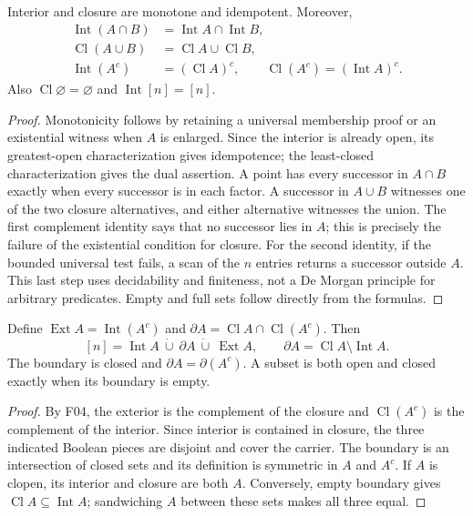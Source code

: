 \begin{theorem}\label{thm:finite-laws}
Interior and closure are monotone and idempotent.  Moreover,
\[
\begin{split}
 \operatorname{Int}(A\cap B)&=\operatorname{Int}A\cap\operatorname{Int}B,\\
 \operatorname{Cl}(A\cup B)&=\operatorname{Cl}A\cup\operatorname{Cl}B,\\
 \operatorname{Int}(A^c)&=(\operatorname{Cl}A)^c,\qquad
 \operatorname{Cl}(A^c)=(\operatorname{Int}A)^c.
\end{split}
\]
Also $\operatorname{Cl}\varnothing=\varnothing$ and
$\operatorname{Int}[n]=[n]$.
\end{theorem}
\begin{proof}
Monotonicity follows by retaining a universal membership proof or an
existential witness when $A$ is enlarged.  Since the interior is
already open, its greatest-open characterization gives idempotence;
the least-closed characterization gives the dual assertion.  A point
has every successor in $A\cap B$ exactly when every successor is
in each factor.  A successor in $A\cup B$ witnesses one of the two
closure alternatives, and either alternative witnesses the union.
The first complement identity says that no successor lies in $A$;
this is precisely the failure of the existential condition for
closure.  For the second identity, if the bounded universal test
fails, a scan of the $n$ entries returns a successor outside $A$.
This last step uses decidability and finiteness, not a De Morgan
principle for arbitrary predicates.  Empty and full sets follow
directly from the formulas.
\end{proof}

\begin{theorem}\label{thm:finite-boundary}
Define $\operatorname{Ext}A=\operatorname{Int}(A^c)$ and
$\partial A=\operatorname{Cl}A\cap\operatorname{Cl}(A^c)$.
Then
\[
 [n]=\operatorname{Int}A\ \dot\cup\ \partial A\ \dot\cup\
             \operatorname{Ext}A,
 \qquad
 \partial A=\operatorname{Cl}A\setminus\operatorname{Int}A.
\]
The boundary is closed and $\partial A=\partial(A^c)$.
A subset is both open and closed exactly when its boundary is empty.
\end{theorem}
\begin{proof}
By F04, the exterior is the complement of the closure and
$\operatorname{Cl}(A^c)$ is the complement of the interior.
Since interior is contained in closure, the three indicated Boolean
pieces are disjoint and cover the carrier.  The boundary is an
intersection of closed sets and its definition is symmetric in $A$
and $A^c$.  If $A$ is clopen, its interior and closure are both $A$.
Conversely, empty boundary gives
$\operatorname{Cl}A\subseteq\operatorname{Int}A$; sandwiching $A$
between these sets makes all three equal.
\end{proof}

